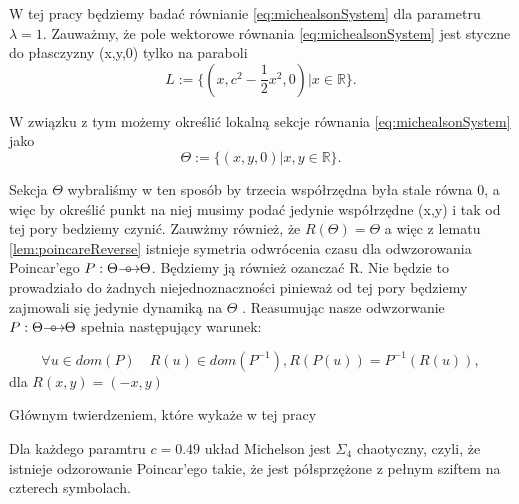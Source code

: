 W tej pracy będziemy badać równianie \eqref{eq:michealsonSystem} dla parametru $ \lambda = 1$.
Zauważmy, że pole wektorowe równania \eqref{eq:michealsonSystem} jest styczne do płasczyzny (x,y,0) 
tylko na paraboli 
$$
      L := \{ (x,c^2 - \frac{1}{2} x^2,0) | x \in \mathbb R\}.
$$

W związku z tym możemy określić lokalną sekcje równania \eqref{eq:michealsonSystem} jako 
$$
  \Theta := \{(x,y,0) | x,y \in \mathbb R \} .
$$

Sekcja $ \Theta $ wybraliśmy w ten sposób by trzecia współrzędna była stale równa 0, 
a więc by określić punkt na niej musimy podać jedynie współrzędne (x,y) i tak od tej pory bedziemy czynić.
Zauwżmy również, że $ R(\Theta) = \Theta $ a więc z lematu \eqref{lem:poincareReverse} istnieje symetria odwrócenia czasu dla odwzorowania Poincar'ego
$ P : \Theta {\mathrel{\longrightarrow\mkern-25mu\circ}\;\;} \Theta $. Będziemy ją również ozanczać R. Nie będzie to prowadziało do żadnych niejednoznaczności pinieważ od tej pory będziemy
zajmowali się jedynie dynamiką na $ \Theta$ .
Reasumując nasze odwzorwanie $ P : \Theta {\mathrel{\longrightarrow\mkern-25mu\circ}\;\;} \Theta $ spełnia następujący warunek:

\begin{equation}
  \forall u \in dom(P) \quad R(u) \in dom(P^{-1}) , R(P(u)) = P^{-1}(R(u)),
\end{equation}
dla $ R(x,y) = (-x,y) $ 

Głównym twierdzeniem, które wykaże w tej pracy 
\begin{theorem}
  Dla każdego paramtru $ c = 0.49 $ układ Michelson jest $ \Sigma_4 $ chaotyczny,
  czyli, że istnieje odzorowanie Poincar'ego takie, że jest półsprzężone z pełnym sziftem na czterech symbolach.
\end{theorem}

